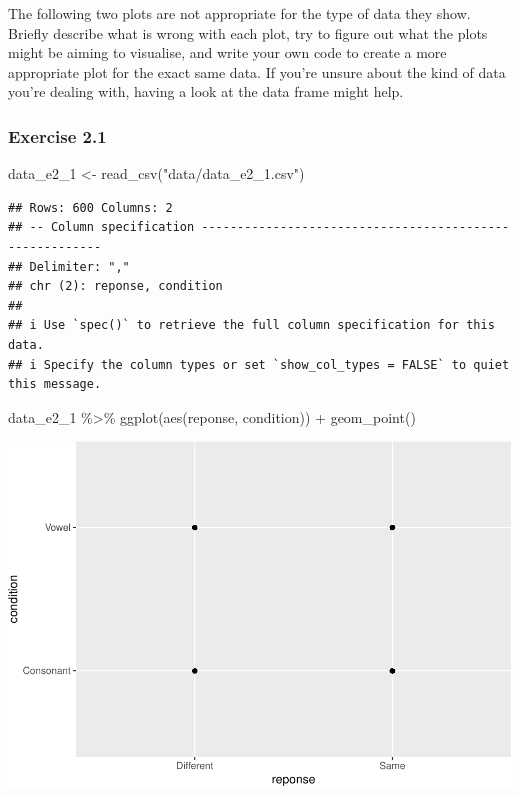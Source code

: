 \documentclass[
]{article}
\newenvironment{Shaded}{\begin{snugshade}}{\end{snugshade}}
\newcommand{\FunctionTok}[1]{\textcolor[rgb]{0.00,0.00,0.00}{#1}}
\newcommand{\NormalTok}[1]{#1}
\newcommand{\OtherTok}[1]{\textcolor[rgb]{0.56,0.35,0.01}{#1}}
\newcommand{\SpecialCharTok}[1]{\textcolor[rgb]{0.00,0.00,0.00}{#1}}
\newcommand{\StringTok}[1]{\textcolor[rgb]{0.31,0.60,0.02}{#1}}
\begin{document}
The following two plots are not appropriate for the type of data they
show. Briefly describe what is wrong with each plot, try to figure out
what the plots might be aiming to visualise, and write your own code to
create a more appropriate plot for the exact same data. If you're unsure
about the kind of data you're dealing with, having a look at the data
frame might help.

\hypertarget{exercise-2.1}{%
\subsubsection{Exercise 2.1}\label{exercise-2.1}}

\begin{Shaded}
\begin{Highlighting}[]
\NormalTok{data\_e2\_1 }\OtherTok{\textless{}{-}} \FunctionTok{read\_csv}\NormalTok{(}\StringTok{"data/data\_e2\_1.csv"}\NormalTok{)}
\end{Highlighting}
\end{Shaded}

\begin{verbatim}
## Rows: 600 Columns: 2
## -- Column specification --------------------------------------------------------
## Delimiter: ","
## chr (2): reponse, condition
## 
## i Use `spec()` to retrieve the full column specification for this data.
## i Specify the column types or set `show_col_types = FALSE` to quiet this message.
\end{verbatim}

\begin{Shaded}
\begin{Highlighting}[]
\NormalTok{data\_e2\_1 }\SpecialCharTok{\%\textgreater{}\%}
  \FunctionTok{ggplot}\NormalTok{(}\FunctionTok{aes}\NormalTok{(reponse, condition)) }\SpecialCharTok{+}
  \FunctionTok{geom\_point}\NormalTok{()}
\end{Highlighting}
\end{Shaded}

\includegraphics{analysis_files/figure-latex/e2-1-1.pdf}
\end{document}
